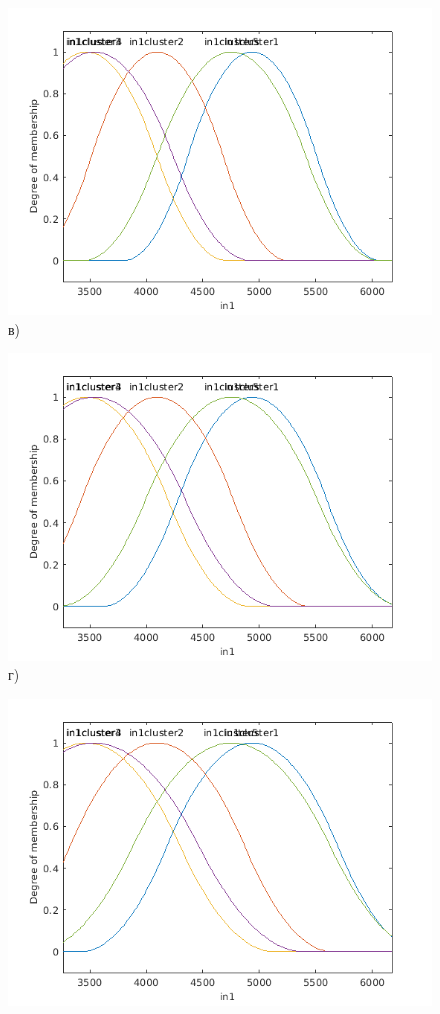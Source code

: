 \begin{figure}[H]
\begin{minipage}[h]{0.49\linewidth}
		\includegraphics[width=1\linewidth]{img/3sigma}
		в)\\
	\end{minipage}
	\hfill
	\begin{minipage}[h]{0.49\linewidth}
		\centering
		\includegraphics[width=1\linewidth]{img/3_5sigma}
		г)\\
	\end{minipage}
	\vfill
	\begin{minipage}[h]{0.49\linewidth}
		\centering
		\includegraphics[width=1\linewidth]{img/4sigma}

\end{minipage}
\end{figure}
